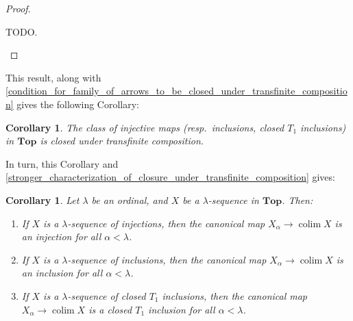 \documentclass{amsart}
\theoremstyle{plain}
\newtheorem{corollary}[theorem]{Corollary}
\theoremstyle{definition}
\newcommand{\Top}{\mbf{Top}}
\newcommand{\0}{\mathbf{0}}
\newcommand{\mbf}[1]{\mathbf{#1}}
\renewcommand{\(}{\left(}
\renewcommand{\)}{\right)}
\DeclareMathOperator*{\colim}{colim}
\begin{document}
\begin{proof}
\begin{enumerate}[label=(\roman*),listparindent=\parindent,parsep=0pt]
    \color{red}TODO.\qedhere
  \end{enumerate}
\end{proof}

This result, along with \autoref{condition_for_family_of_arrows_to_be_closed_under_transfinite_composition} gives the following Corollary:

\begin{corollary}
  The class of injective maps (resp.\ inclusions, closed $T_1$ inclusions) in $\Top$ is closed under transfinite composition.
\end{corollary}

In turn, this Corollary and \autoref{stronger_characterization_of_closure_under_transfinite_composition} gives:

\begin{corollary}\label{inclusions_closed_under_transfinite_composition}
  Let $\lambda$ be an ordinal, and $X$ be a $\lambda$-sequence in $\Top$. 
  Then:
  \begin{enumerate}[label=(\roman*),noitemsep]
    \item If $X$ is a $\lambda$-sequence of injections, then the canonical map $X_\alpha\to\colim X$ is an injection for all $\alpha<\lambda$.
    \item If $X$ is a $\lambda$-sequence of inclusions, then the canonical map $X_\alpha\to\colim X$ is an inclusion for all $\alpha<\lambda$.
    \item If $X$ is a $\lambda$-sequence of closed $T_1$ inclusions, then the canonical map $X_\alpha\to\colim X$ is a closed $T_1$ inclusion for all $\alpha<\lambda$.
  \end{enumerate} 
\end{corollary}
\end{document}
